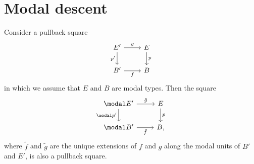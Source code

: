 \documentclass{msc}
\begin{document}
\section{Modal descent}\label{section:modal-descent}

\begin{prp}\label{thm:etale_flattening}
Consider a pullback square
\begin{equation*}
\begin{tikzcd}
E' \arrow[d,swap,"{p'}"] \arrow[r,"g"] & E \arrow[d,"p"] \\
B' \arrow[r,swap,"f"] & B
\end{tikzcd}
\end{equation*}
in which we assume that $E$ and $B$ are modal types. Then the square
  \begin{equation*}
    \begin{tikzcd}
      \modal E' \arrow[r,"\tilde{g}"] \arrow[d,swap,"{\modal p'}"] & E \arrow[d,"p"] \\
      \modal B' \arrow[r,swap,"\tilde{f}"] & B,
    \end{tikzcd}
  \end{equation*}
  where $\tilde{f}$ and $\tilde{g}$ are the unique extensions of $f$ and $g$ along the modal units of $B'$ and $E'$, is also a pullback square.
\end{prp}
\end{document}
